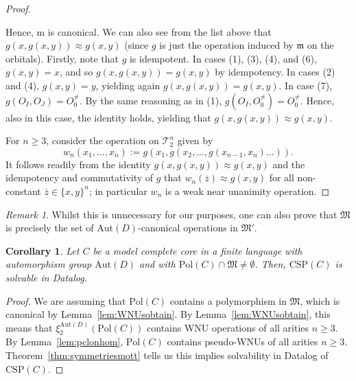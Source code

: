 \documentclass{article}
\newtheorem{corollary}[theorem]{Corollary}
\theoremstyle{remark}
\newtheorem{remark}[theorem]{Remark}
\theoremstyle{definition}
\begin{document}
\begin{proof}
\begin{enumerate}
\end{enumerate}
Hence, $\mathrm{m}$ is canonical. We can also see from the list above that $g(x,g(x,y))\approx g(x,y)$ (since $g$ is just the operation induced by $\mathfrak{m}$ on the orbitals). Firstly, note that $g$ is idempotent. In cases (1), (3), (4), and (6), $g(x,y)=x$, and so $g(x,g(x,y))=g(x,y)$ by idempotency. In cases (2) and (4), $g(x,y)=y$, yielding again $g(x,g(x,y))=g(x,y)$. In case (7), $g(O_I, O_J)=O^{\neq}_0$. By the same reasoning as in (1), $g(O_I, O^{\neq}_0)=O^{\neq}_0$. Hence, also in this case, the identity holds, yielding that $g(x,g(x,y))\approx g(x,y)$.

For $n\geq 3$, consider the operation on $\mathcal{T}_2^n$ given by
\[w_n(x_1, \dots, x_n):=g(x_1, g(x_2, \dots ,g(x_{n-1}, x_n)\dots )).\]
It follows readily from the identity $g(x,g(x,y))\approx g(x,y)$ and the idempotency and commutativity of $g$ that $w_n(\overline{z})\approx g(x,y)$ for all non-constant $\overline{z}\in\{x,y\}^n$; in particular $w_n$ is a weak near unanimity operation.
\end{proof}

\begin{remark} Whilst this is unnecessary for our purposes, one can also prove that $\mathfrak{M}$ is precisely the set of $\mathrm{Aut}(D)$-canonical operations in $\mathfrak{M}'$.
\end{remark}

\begin{corollary}\label{cor:solvabilitycriteriondat} Let $C$ be a model complete core in a finite language with automorphism group $\mathrm{Aut}(D)$ and with $\mathrm{Pol}(C)\cap\mathfrak{M}\neq\emptyset$. Then, $\mathrm{CSP}(C)$ is solvable in Datalog. 
\end{corollary}
\begin{proof} We are assuming that $\mathrm{Pol}(C)$ contains a  polymorphism in $\mathfrak{M}$, which is canonical by Lemma~\ref{lem:WNUsobtain}. By  Lemma~\ref{lem:WNUsobtain}, this means that $\xi_2^{\mathrm{Aut}(D)}(\mathrm{Pol}(C))$ contains WNU operations of all arities $n\geq 3$. By Lemma~\ref{lem:pclonhom}, $\mathrm{Pol}(C)$ contains pseudo-WNUs of all arities $n\geq 3$. Theorem~\ref{thm:symmetriesmott} tells us this implies solvability in Datalog of $\mathrm{CSP}(C)$.
\end{proof}
\end{document}
